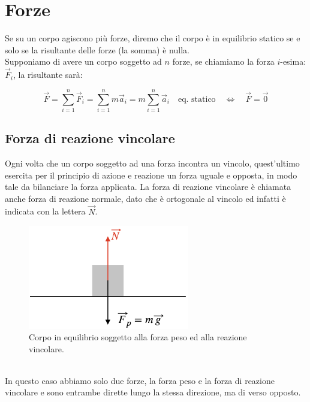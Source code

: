 \section{Forze}
Se su un corpo agiscono più forze, diremo che il corpo è in equilibrio
statico se e solo se la risultante delle forze (la somma) è nulla.\\
Supponiamo di avere un corpo soggetto ad $n$ forze, se chiamiamo la
forza $i$-esima: $\vec F_i$, la risultante sarà:

\begin{equation}
    \vec F = \sum_{i=1}^n\vec F_i =  \sum_{i=1}^n m\vec a_i =
    m \sum_{i=1}^n \vec a_i\quad\mbox{eq. statico}\quad\Leftrightarrow
    \quad\vec F = \vec 0
\label{eq:forces:superposition}
\end{equation}

\subsection{Forza di reazione vincolare}
Ogni volta che un corpo soggetto ad una forza incontra un vincolo,
quest'ultimo esercita per il principio di azione e reazione un forza
uguale e opposta, in modo tale da bilanciare la forza applicata.
La forza di reazione vincolare è chiamata anche forza di reazione normale,
dato che è ortogonale al vincolo ed infatti è indicata con la lettera $\vec N$.
\begin{figure}[htbp]
    \begin{center}
        \includegraphics[width=7cm]{images/NP.png}
        \caption{Corpo in equilibrio soggetto alla forza peso ed  alla
        reazione vincolare.}
    \end{center}
\label{fig:forces:vincolar_reaction}
\end{figure}
\\
In questo caso abbiamo solo due forze, la forza peso e la forza di reazione
vincolare e sono entrambe dirette lungo la stessa direzione, ma di verso
opposto.

